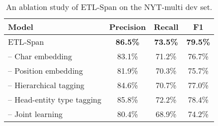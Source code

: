 \documentclass{ecai}
\begin{document}
\begin{table}
\begin{center}
{\caption{ Comparison of test-time speed. Bat/s refers to the number of batches can be processed per second.}\label{tab:speed}}
\end{center}
\end{table} 

\begin{table}
\begin{center}
{\caption{An ablation study of ETL-Span on the NYT-multi dev set.}
\label{tab:ablation}}
\begin{tabular}{lccc}
  \toprule
      Model                & Precision & Recall & F1 \\
  \midrule
  ETL-Span                & \textbf{86.5\%} & \textbf{73.5\%} & \textbf{79.5\%}    \\
  \quad-- Char embedding  & 83.1\% & 71.2\% & 76.7\%   \\
\quad-- Position embedding   & 81.9\% & 70.3\% & 75.7\%    \\
  \quad-- Hierarchical tagging & 84.6\% & 70.7\% & 77.0\%    \\
  \quad-- Head-entity type tagging & 85.8\% & 72.2\% & 78.4\%    \\
    \quad-- Joint learning & 80.4\% & 68.9\% & 74.2\%    \\
  \bottomrule
\end{tabular}
\end{center}
\end{table}
\end{document}
